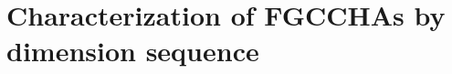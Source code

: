\documentclass[11pt]{amsart}
\theoremstyle{definition}
\numberwithin{equation}{section}
\newcommand{\FGCCHAs}{\textsf{FGCCHA}s\xspace}
\begin{document}

%

\section{Characterization of \FGCCHAs by dimension sequence}
\label{sec:isoclassification}
\end{document}
